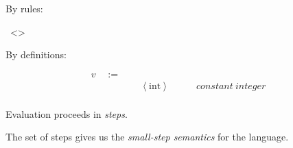 \begin{frame}

  By rules:

  \infrule[V-Int]
          {}
          {~\left<\right>}
\end{frame}

\begin{frame}

  By definitions:
  
\begin{displaymath}
    \begin{aligned}
v \quad:=\quad& ~ &\\
  & ~ \left<\text{int}\right> \quad\quad &constant~integer\\
    \end{aligned}
  \end{displaymath}
\end{frame}

\begin{frame}[c]
  Evaluation proceeds in {\it steps}.
\end{frame}

\begin{frame}[c]
  The set of steps gives us the {\it small-step semantics} for the language.
\end{frame}

